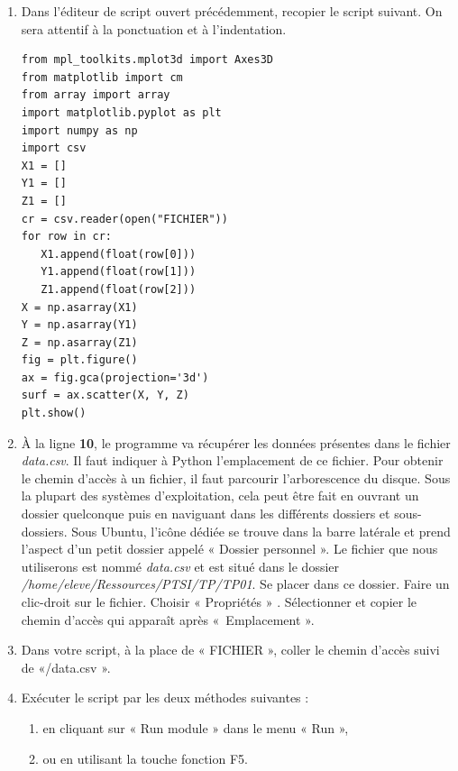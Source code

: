 \begin{exercice}

\begin{enumerate}
\item Dans l'éditeur de script ouvert précédemment, recopier le script suivant. On sera attentif \` a la ponctuation et \` a l'indentation.

\begin{verbatim}
from mpl_toolkits.mplot3d import Axes3D
from matplotlib import cm
from array import array   
import matplotlib.pyplot as plt   
import numpy as np   
import csv   
X1 = []   
Y1 = []   
Z1 = []   
cr = csv.reader(open("FICHIER"))   
for row in cr:   
   X1.append(float(row[0]))
   Y1.append(float(row[1]))  
   Z1.append(float(row[2]))
X = np.asarray(X1)   
Y = np.asarray(Y1)   
Z = np.asarray(Z1)   
fig = plt.figure()   
ax = fig.gca(projection='3d')   
surf = ax.scatter(X, Y, Z)   
plt.show()
\end{verbatim}

\item À la ligne \textbf{10}, le programme va r\' ecup\' erer les donn\' ees pr\' esentes dans le fichier \textit{data.csv}. Il faut indiquer \` a Python l'emplacement de ce fichier. Pour obtenir le chemin d'acc\` es \` a un fichier, il faut parcourir l'arborescence du disque. Sous la plupart des syst\` emes d'exploitation, cela peut \^ etre fait en ouvrant un dossier quelconque puis en naviguant dans les diff\' erents dossiers et sous-dossiers. Sous Ubuntu, l'ic\^ one d\' edi\' ee se trouve dans la barre lat\' erale et prend l'aspect d'un petit dossier appel\' e « Dossier personnel ». Le fichier que nous utiliserons est nomm\' e \textit{data.csv} et est situ\' e dans le dossier \textit{/home/eleve/Ressources/PTSI/TP/TP01}. Se placer dans ce dossier. Faire un clic-droit sur le fichier. Choisir « Propri\' et\' es » . S\' electionner et copier le chemin d'acc\` es qui appara\^ it apr\` es «~Emplacement ».
\item Dans votre script, \` a la place de « FICHIER », coller le chemin d'acc\` es suivi de «/data.csv ».
\item Ex\' ecuter le script par les deux m\' ethodes suivantes :

\begin{enumerate}
\item en cliquant sur « Run module » dans le menu « Run », 
\item ou en utilisant la touche fonction F5.
\end{enumerate}
\end{enumerate}
\end{exercice}

